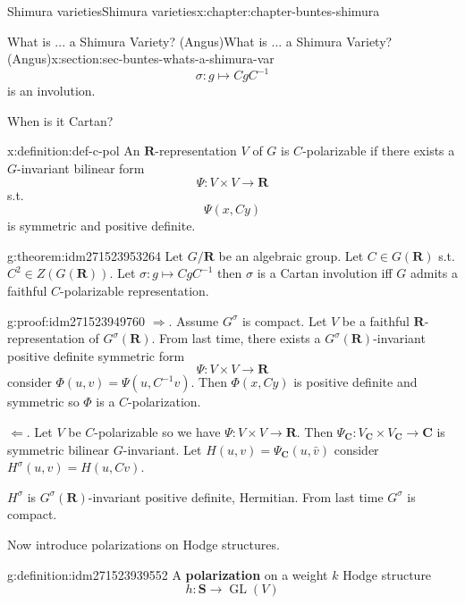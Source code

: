 \documentclass[oneside,10pt,]{book}
\newcommand{\terminology}[1]{\textbf{#1}}
\numberwithin{equation}{section}
\newcommand{\inv}{^{-1}}
\newcommand{\RR}{\mathbf{R}}
\newcommand{\CC}{\mathbf{C}}
\DeclareMathOperator{\GL}{GL}
\begin{document}
\begin{chapterptx}{Shimura varieties}{}{Shimura varieties}{}{}{x:chapter:chapter-buntes-shimura}
\begin{sectionptx}{What is ... a Shimura Variety? (Angus)}{}{What is ... a Shimura Variety? (Angus)}{}{}{x:section:sec-buntes-whats-a-shimura-var}
\begin{equation*}
\sigma \colon g \mapsto CgC\inv
\end{equation*}
is an involution.%
\par
When is it Cartan?%
\begin{definition}{}{x:definition:def-c-pol}%
An \(\RR\)-representation \(V\) of \(G\) is \(C\)-polarizable if there exists a \(G\)-invariant bilinear form%
\begin{equation*}
\Psi \colon V \times V \to \RR
\end{equation*}
s.t.%
\begin{equation*}
\Psi(x,Cy)
\end{equation*}
is symmetric and positive definite.%
\end{definition}
\begin{theorem}{}{}{g:theorem:idm271523953264}%
Let \(G/\RR\) be an algebraic group. Let \(C  \in G(\RR)\) s.t. \(C^2 \in Z(G(\RR))\). Let \(\sigma \colon g\mapsto Cg C\inv\)  then \(\sigma\) is a Cartan involution iff \(G\) admits a faithful \(C\)-polarizable representation.%
\end{theorem}
\begin{proofptx}{}{g:proof:idm271523949760}
\(\Rightarrow\). Assume \(G^\sigma \) is compact. Let \(V\) be a faithful \(\RR\)-representation of \(G^\sigma (\RR)\). From last time, there exists a \(G^\sigma(\RR)\)-invariant positive definite symmetric form%
\begin{equation*}
\Psi\colon V\times V\to \RR
\end{equation*}
consider \(\Phi(u,v) = \Psi(u, C\inv v)\). Then \(\Phi(x,Cy)\) is positive definite and symmetric so \(\Phi\) is a \(C\)-polarization.%
\par
\(\Leftarrow\). Let \(V\) be \(C\)-polarizable so we have \(\Psi \colon V\times V \to  \RR\). Then \(\Psi_\CC \colon V_\CC \times V_\CC \to \CC\) is symmetric bilinear \(G\)-invariant. Let \(H(u,v) = \Psi_\CC(u,\bar v)\) consider \(H^\sigma(u,v) = H(u,Cv)\).%
\par
\(H^\sigma\) is \(G^\sigma(\RR)\)-invariant positive definite, Hermitian. From last time \(G^\sigma\) is compact.%
\end{proofptx}
Now introduce polarizations on Hodge structures.%
\begin{definition}{}{g:definition:idm271523939552}%
A \terminology{polarization} on a weight \(k\) Hodge structure%
\begin{equation*}
h\colon \mathbf S \to \GL(V)
\end{equation*}
%
\begin{equation*}

\end{equation*}
\end{definition}
\end{sectionptx}
\end{chapterptx}
\end{document}
